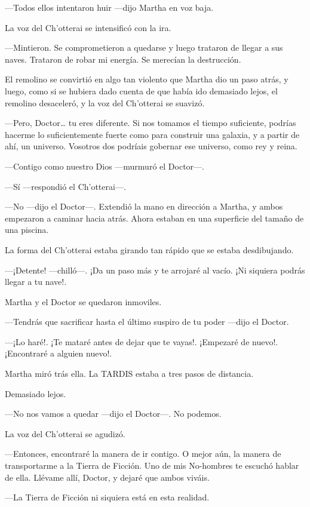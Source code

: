 ---Todos ellos intentaron huir ---dijo Martha en voz baja.

La voz del Ch'otterai se intensificó con la ira.

---Mintieron. Se comprometieron a quedarse y luego trataron de llegar a sus naves. Trataron de robar mi energía. Se merecían la destrucción.

El remolino se convirtió en algo tan violento que Martha dio un paso atrás, y luego, como si se hubiera dado cuenta de que había ido demasiado lejos, el remolino desaceleró, y la voz del Ch'otterai se suavizó.

---Pero, Doctor\ldots{} tu eres diferente. Si nos tomamos el tiempo suficiente, podrías hacerme lo suficientemente fuerte como para construir una galaxia, y a partir de ahí, un universo. Vosotros dos podríais gobernar ese universo, como rey y reina.

---Contigo como nuestro Dios ---murmuró el Doctor---.

---Sí ---respondió el Ch'otterai---.

---No ---dijo el Doctor---. Extendió la mano en dirección a Martha, y ambos empezaron a caminar hacia atrás. Ahora estaban en una superficie del tamaño de una piscina.

La forma del Ch'otterai estaba girando tan rápido que se estaba desdibujando.

---¡Detente! ---chilló---. ¡Da un paso más y te arrojaré al vacío. ¡Ni siquiera podrás llegar a tu nave!.

Martha y el Doctor se quedaron inmoviles.

---Tendrás que sacrificar hasta el último suspiro de tu poder ---dijo el Doctor.

---¡Lo haré!. ¡Te mataré antes de dejar que te vayas!. ¡Empezaré de nuevo!. ¡Encontraré a alguien nuevo!.

Martha miró trás ella. La TARDIS estaba a tres pasos de distancia.

Demasiado lejos.

---No nos vamos a quedar ---dijo el Doctor---. No podemos.

La voz del Ch'otterai se agudizó.

---Entonces, encontraré la manera de ir contigo. O mejor aún, la manera de transportarme a la Tierra de Ficción. Uno de mis No-hombres te escuchó hablar de ella. Llévame allí, Doctor, y dejaré que ambos viváis.

---La Tierra de Ficción ni siquiera está en esta realidad.

